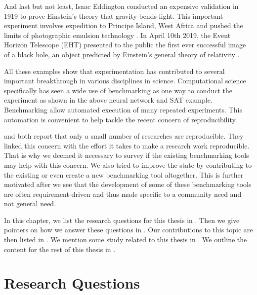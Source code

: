 And last but not least, Isaac Eddington conducted an expensive validation in 1919 to prove Einstein's theory that gravity bends light.
This important experiment involves expedition to Principe Island, West Africa and pushed the limits of photographic emulsion technology \citep{tichyShouldComputerScientists1998}.
In April 10th 2019, the Event Horizon Telescope (EHT) presented to the public the first ever successful image of a black hole, an object predicted by Einstein's general theory of relativity \citep{akiyama2019first}.

All these examples show that experimentation has contributed to several important breakthrough in various disciplines in science.
Computational science specifically has seen a wide use of benchmarking as one way to conduct the experiment as shown in the above neural network and SAT example.
Benchmarking allow automated execution of many repeated experiments.
This automation is convenient to help tackle the recent concern of reproducibility.

\citet{gundersenStateArtReproducibility2018} and \citet{collbergRepeatabilityComputerSystems2016} both report that only a small number of researches are reproducible.
They linked this concern with the effort it takes to make a research work reproducible.
That is why we deemed it necessary to survey if the existing benchmarking tools may help with this concern.
We also tried to improve the state by contributing to the existing or even create a new benchmarking tool altogether.
This is further motivated after we see that the development of some of these benchmarking tools are often requirement-driven and thus made specific to a community need and not general need.

In this chapter, we list the research questions for this thesis in .
Then we give pointers on how we answer these questions in .
Our contributions to this topic are then listed in .
We mention some study related to this thesis in .
We outline the content for the rest of this thesis in .

\section{Research Questions}
\label{sec:intro.questions}


